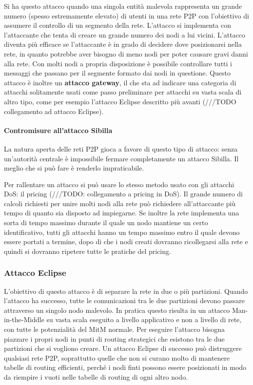 Si ha questo attacco quando una singola entità malevola rappresenta un
grande numero (spesso estremamente elevato) di utenti in una rete P2P
con l'obiettivo di assumere il controllo di un segmento della rete.
L'attacco si implementa con l'attaccante che tenta di creare un grande
numero dei nodi a lui vicini. L'attacco diventa più efficace se
l'attaccante è in grado di decidere dove posizionarsi nella rete, in
quanto potrebbe aver bisogno di meno nodi per poter causare gravi danni
alla rete. Con molti nodi a propria disposizione è possibile controllare
tutti i messaggi che passano per il segmente formato dai nodi in
questione. Questo attacco è inoltre un \textbf{attacco gateway}, il che
sta ad indicare una categoria di attacchi solitamente usati come passo
preliminare per attacchi su vasta scala di altro tipo, come per esempio
l'attacco Eclipse descritto più avanti (///TODO collegamento ad attacco
Eclipse).

\paragraph{Contromisure all'attacco
Sibilla}\label{contromisure-allattacco-sibilla}

La natura aperta delle reti P2P gioca a favore di questo tipo di
attacco: senza un'autorità centrale è impossibile fermare completamente
un attacco Sibilla. Il meglio che si può fare è renderlo impraticabile.

Per rallentare un attacco si può usare lo stesso metodo usato con gli
attacchi DoS: il pricing (///TODO: collegamento a pricing in DoS). Il
grande numero di calcoli richiesti per unire molti nodi alla rete può
richiedere all'attaccante più tempo di quanto sia disposto ad
impiegarne. Se inoltre la rete implementa una sorta di tempo massimo
durante il quale un nodo mantiene un certo identificativo, tutti gli
attacchi hanno un tempo massimo entro il quale devono essere portati a
termine, dopo di che i nodi creati dovranno ricollegarsi alla rete e
quindi si dovranno ripetere tutte le pratiche del pricing.

\subsubsection{Attacco Eclipse}\label{attacco-eclipse}

L'obiettivo di questo attacco è di separare la rete in due o più
partizioni. Quando l'attacco ha successo, tutte le comunicazioni tra le
due partizioni devono passare attraverso un singolo nodo malevolo. In
pratica questo risulta in un attacco Man-in-the-Middle su vasta scala
eseguito a livello applicativo e non a livello di rete, con tutte le
potenzialità del MitM normale. Per eseguire l'attacco bisogna piazzare i
propri nodi in punti di routing strategici che esistono tra le due
partizioni che si vogliono creare. Un attacco Eclipse di successo può
distruggere qualsiasi rete P2P, soprattutto quelle che non si curano
molto di mantenere tabelle di routing efficienti, perché i nodi finti
possono essere posizionati in modo da riempire i vuoti nelle tabelle di
routing di ogni altro nodo.

